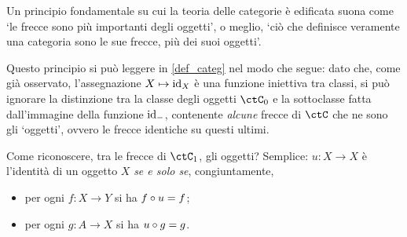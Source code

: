 \begin{remark}
	Un principio fondamentale su cui la teoria delle categorie è edificata suona come `le frecce sono più importanti degli oggetti', o meglio, `ciò che definisce veramente una categoria sono le sue frecce, più dei suoi oggetti'.

	Questo principio si può leggere in \ref{def_categ} nel modo che segue: dato che, come già osservato, l'assegnazione \(X\mapsto\Id[X]\) è una funzione iniettiva tra classi, si può ignorare la distinzione tra la classe degli oggetti \(\ctC_0\) e la sottoclasse fatta dall'immagine della funzione \(\Id[-]\), contenente \emph{alcune} frecce di \(\ctC\) che ne sono gli `oggetti', ovvero le frecce identiche su questi ultimi.

	Come riconoscere, tra le frecce di \(\ctC_1\), gli oggetti? Semplice: \(u : X\to X\) è l'identità di un oggetto \(X\) \emph{se e solo se}, congiuntamente,
	\begin{itemize}
		\item per ogni \(f : X\to Y\) si ha \(f\circ u = f\);
		\item per ogni \(g : A\to X\) si ha \(u\circ g = g\).
	\end{itemize}
\end{remark}
